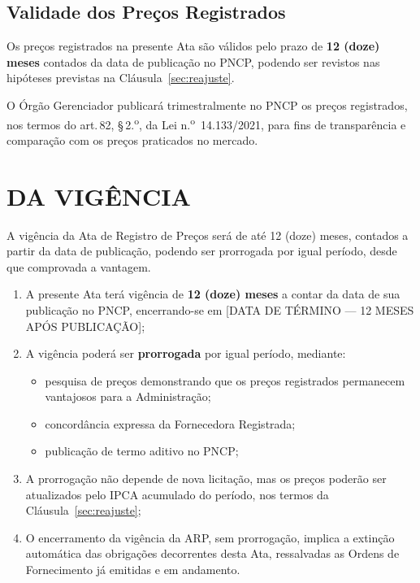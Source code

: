 \documentclass[12pt,a4paper]{article}
\newcommand{\art}[1]{art.\,#1}
\newcommand{\vigFim}{[DATA DE TÉRMINO --- 12 MESES APÓS PUBLICAÇÃO]}
\begin{document}
\subsection{Validade dos Preços Registrados}

Os preços registrados na presente Ata são válidos pelo prazo de \textbf{12 (doze)
meses} contados da data de publicação no PNCP, podendo ser revistos nas hipóteses
previstas na Cláusula~\ref{sec:reajuste}.

\begin{alertbox}
\small
O Órgão Gerenciador publicará trimestralmente no PNCP os preços registrados,
nos termos do \art{82}, \S\,2.\textsuperscript{o}, da Lei
n.\textsuperscript{o}~14.133/2021, para fins de transparência e comparação com
os preços praticados no mercado.
\end{alertbox}

\section{DA VIGÊNCIA}

\begin{legalbox}[\art{84}, \S\,1.\textsuperscript{o}, Lei n.\textsuperscript{o} 14.133/2021]
\small
A vigência da Ata de Registro de Preços será de até 12 (doze) meses, contados a
partir da data de publicação, podendo ser prorrogada por igual período, desde que
comprovada a vantagem.
\end{legalbox}

\begin{enumerate}
  \item A presente Ata terá vigência de \textbf{12 (doze) meses} a contar da data
    de sua publicação no PNCP, encerrando-se em \vigFim;

  \item A vigência poderá ser \textbf{prorrogada} por igual período, mediante:
    \begin{itemize}
      \item pesquisa de preços demonstrando que os preços registrados permanecem
        vantajosos para a Administração;
      \item concordância expressa da Fornecedora Registrada;
      \item publicação de termo aditivo no PNCP;
    \end{itemize}

  \item A prorrogação não depende de nova licitação, mas os preços poderão ser
    atualizados pelo IPCA acumulado do período, nos termos da Cláusula~\ref{sec:reajuste};

  \item O encerramento da vigência da ARP, sem prorrogação, implica a extinção
    automática das obrigações decorrentes desta Ata, ressalvadas as Ordens de
    Fornecimento já emitidas e em andamento.
\end{enumerate}
\end{document}
